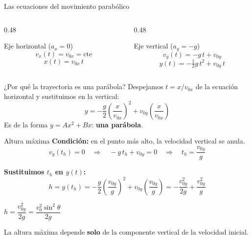 \documentclass[aspectratio=169,xcolor=dvipsnames]{beamer}
\begin{document}
	\begin{frame}{Las ecuaciones del movimiento parabólico}
		\begin{columns}[T]
			\begin{column}{0.48\textwidth}
				\begin{block}{Eje horizontal ($a_x = 0$)}
					\[
					v_x(t) = v_{0x} = \text{cte}
					\]
					\[
					x(t) = v_{0x}\,t
					\]
				\end{block}
			\end{column}
			\begin{column}{0.48\textwidth}
				\begin{block}{Eje vertical ($a_y = -g$)}
					\[
					v_y(t) = -g\,t + v_{0y}
					\]
					\[
					y(t) = -\tfrac{1}{2}g\,t^2 + v_{0y}\,t
					\]
				\end{block}
			\end{column}
		\end{columns}
		
		\vspace{0.35cm}
		\begin{exampleblock}{¿Por qué la trayectoria es una parábola?}
			Despejamos $t = x/v_{0x}$ de la ecuación horizontal y sustituimos en la vertical:
			\[
			y = -\frac{g}{2}\left(\frac{x}{v_{0x}}\right)^{2} + v_{0y}\left(\frac{x}{v_{0x}}\right)
			\]
			\centering
			\small Es de la forma $y = Ax^2 + Bx$: \textbf{una parábola}.
		\end{exampleblock}
	\end{frame}
	
	\begin{frame}{Altura máxima}
		\small
		\textbf{Condición:} en el punto más alto, la velocidad vertical se anula.
		\[
		v_y(t_h) = 0 \quad\Longrightarrow\quad -g\,t_h + v_{0y} = 0
		\quad\Longrightarrow\quad t_h = \frac{v_{0y}}{g}
		\]
		
		\vspace{0.15cm}
		\textbf{Sustituimos $t_h$ en $y(t)$:}
		\[
		h = y(t_h) = -\frac{g}{2}\left(\frac{v_{0y}}{g}\right)^{2} + v_{0y}\left(\frac{v_{0y}}{g}\right)
		= -\frac{v_{0y}^{2}}{2g} + \frac{v_{0y}^{2}}{g}
		\]
		
		\vspace{0.1cm}
		\begin{exampleblock}{}
			\centering
			\Large $h = \dfrac{v_{0y}^{2}}{2g} = \dfrac{v_{0}^{2}\sin^{2}\theta}{2g}$
		\end{exampleblock}
		
		\vspace{0.1cm}
		\begin{center}
			\small La altura máxima depende \textbf{solo} de la componente vertical de la velocidad inicial.
		\end{center}
	\end{frame}
	
\end{document}
